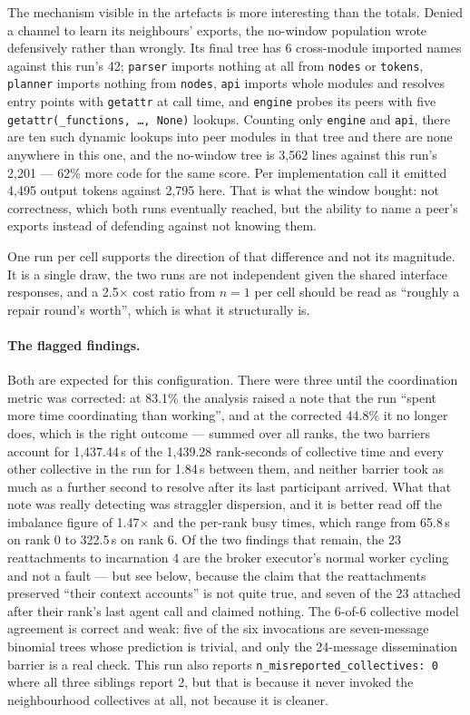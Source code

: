 \documentclass[11pt]{article}
\begin{document}
The mechanism visible in the artefacts is more interesting than the totals. Denied a channel to
learn its neighbours' exports, the no-window population wrote defensively rather than wrongly.
Its final tree has 6 cross-module imported names against this run's 42; \texttt{parser} imports
nothing at all from \texttt{nodes} or \texttt{tokens}, \texttt{planner} imports nothing from
\texttt{nodes}, \texttt{api} imports whole modules and resolves entry points with
\texttt{getattr} at call time, and \texttt{engine} probes its peers with five
\texttt{getattr(\_functions, \ldots, None)} lookups. Counting only \texttt{engine} and
\texttt{api}, there are ten such dynamic lookups into peer modules in that tree and there are
none anywhere in this one, and the no-window tree is 3{,}562 lines against this run's 2{,}201 ---
62\% more code for the same score. Per implementation call it emitted 4{,}495 output tokens
against 2{,}795 here. That is what the window bought: not correctness, which both runs
eventually reached, but the ability to name a peer's exports instead of defending against not
knowing them.

One run per cell supports the direction of that difference and not its magnitude. It is a single
draw, the two runs are not independent given the shared interface responses, and a 2.5$\times$
cost ratio from $n=1$ per cell should be read as ``roughly a repair round's worth'', which is what
it structurally is.

\paragraph{The flagged findings.} Both are expected for this configuration. There were three
until the coordination metric was corrected: at 83.1\% the analysis raised a note that the run
``spent more time coordinating than working'', and at the corrected 44.8\% it no longer does,
which is the right outcome --- summed over all ranks, the two barriers account for 1{,}437.44\,s
of the 1{,}439.28 rank-seconds of collective time and every other collective in the run for
1.84\,s between them, and neither barrier took as much as a further second to resolve after its
last participant arrived. What that note was really detecting was straggler dispersion, and it is
better read off the imbalance figure of 1.47$\times$ and the per-rank busy times, which range
from 65.8\,s on rank 0 to 322.5\,s on rank 6. Of the two findings that remain, the 23
reattachments to incarnation 4 are
the broker executor's normal worker cycling and not a fault --- but see below, because the claim
that the reattachments preserved ``their context accounts'' is not quite true, and seven of the
23 attached after their rank's last agent call and claimed nothing. The 6-of-6 collective model
agreement is correct and weak: five of the six invocations are seven-message binomial trees whose
prediction is trivial, and only the 24-message dissemination barrier is a real check. This run
also reports \texttt{n\_misreported\_collectives: 0} where all three siblings report 2, but that
is because it never invoked the neighbourhood collectives at all, not because it is cleaner.
\end{document}
